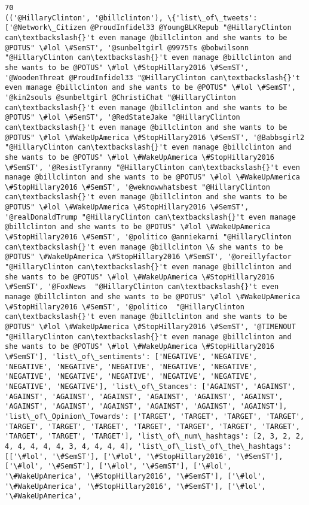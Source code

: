 \documentclass[11pt]{article}
\begin{document}
    \begin{Verbatim}[commandchars=\\\{\}]
70
(('@HillaryClinton', '@billclinton'), \{'list\_of\_tweets': ['@Network\_Citizen @ProudInfidel33 @YoungBLKRepub "@HillaryClinton can\textbackslash{}'t even manage @billclinton and she wants to be @POTUS" \#lol \#SemST', '@sunbeltgirl @9975Ts @bobwilsonn "@HillaryClinton can\textbackslash{}'t even manage @billclinton and she wants to be @POTUS" \#lol \#StopHillary2016 \#SemST', '@WoodenThreat @ProudInfidel33 "@HillaryClinton can\textbackslash{}'t even manage @billclinton and she wants to be @POTUS" \#lol \#SemST', '@kin2souls @sunbeltgirl @ChristiChat "@HillaryClinton can\textbackslash{}'t even manage @billclinton and she wants to be @POTUS" \#lol \#SemST', '@RedStateJake "@HillaryClinton can\textbackslash{}'t even manage @billclinton and she wants to be @POTUS" \#lol \#WakeUpAmerica \#StopHillary2016 \#SemST', '@Babbsgirl2 "@HillaryClinton can\textbackslash{}'t even manage @billclinton and she wants to be @POTUS" \#lol \#WakeUpAmerica \#StopHillary2016 \#SemST', '@ResistTyranny "@HillaryClinton can\textbackslash{}'t even manage @billclinton and she wants to be @POTUS" \#lol \#WakeUpAmerica \#StopHillary2016 \#SemST', '@weknowwhatsbest "@HillaryClinton can\textbackslash{}'t even manage @billclinton and she wants to be @POTUS" \#lol \#WakeUpAmerica \#StopHillary2016 \#SemST', '@realDonaldTrump "@HillaryClinton can\textbackslash{}'t even manage @billclinton and she wants to be @POTUS" \#lol \#WakeUpAmerica \#StopHillary2016 \#SemST', '@politico @anniekarni "@HillaryClinton can\textbackslash{}'t even manage @billclinton \& she wants to be @POTUS" \#WakeUpAmerica \#StopHillary2016 \#SemST', '@oreillyfactor "@HillaryClinton can\textbackslash{}'t even manage @billclinton and she wants to be @POTUS" \#lol \#WakeUpAmerica \#StopHillary2016 \#SemST', '@FoxNews  "@HillaryClinton can\textbackslash{}'t even manage @billclinton and she wants to be @POTUS" \#lol \#WakeUpAmerica \#StopHillary2016 \#SemST', '@politico  "@HillaryClinton can\textbackslash{}'t even manage @billclinton and she wants to be @POTUS" \#lol \#WakeUpAmerica \#StopHillary2016 \#SemST', '@TIMENOUT  "@HillaryClinton can\textbackslash{}'t even manage @billclinton and she wants to be @POTUS" \#lol \#WakeUpAmerica \#StopHillary2016 \#SemST'], 'list\_of\_sentiments': ['NEGATIVE', 'NEGATIVE', 'NEGATIVE', 'NEGATIVE', 'NEGATIVE', 'NEGATIVE', 'NEGATIVE', 'NEGATIVE', 'NEGATIVE', 'NEGATIVE', 'NEGATIVE', 'NEGATIVE', 'NEGATIVE', 'NEGATIVE'], 'list\_of\_Stances': ['AGAINST', 'AGAINST', 'AGAINST', 'AGAINST', 'AGAINST', 'AGAINST', 'AGAINST', 'AGAINST', 'AGAINST', 'AGAINST', 'AGAINST', 'AGAINST', 'AGAINST', 'AGAINST'], 'list\_of\_Opinion\_Towards': ['TARGET', 'TARGET', 'TARGET', 'TARGET', 'TARGET', 'TARGET', 'TARGET', 'TARGET', 'TARGET', 'TARGET', 'TARGET', 'TARGET', 'TARGET', 'TARGET'], 'list\_of\_num\_hashtags': [2, 3, 2, 2, 4, 4, 4, 4, 4, 3, 4, 4, 4, 4], 'list\_of\_list\_of\_the\_hashtags': [['\#lol', '\#SemST'], ['\#lol', '\#StopHillary2016', '\#SemST'], ['\#lol', '\#SemST'], ['\#lol', '\#SemST'], ['\#lol', '\#WakeUpAmerica', '\#StopHillary2016', '\#SemST'], ['\#lol', '\#WakeUpAmerica', '\#StopHillary2016', '\#SemST'], ['\#lol', '\#WakeUpAmerica', 
\end{Verbatim}
\end{document}
